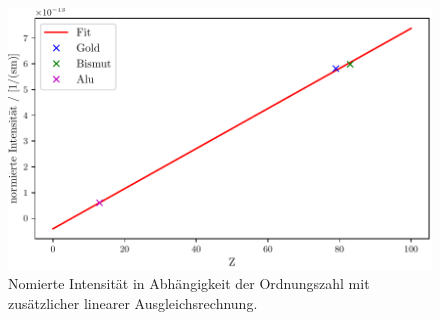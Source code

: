 \begin{figure}
  \centering
  \includegraphics{build/Z.pdf}
  \caption{Nomierte Intensität in Abhängigkeit der Ordnungszahl mit zusätzlicher linearer Ausgleichsrechnung.}
  \label{fig:Wirkungsquerschnitt}
\end{figure}


